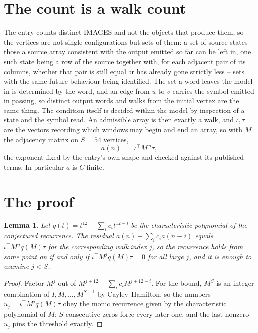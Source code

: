 \documentclass[11pt,a4paper]{article}
\theoremstyle{plain}
\newtheorem{lemma}[theorem]{Lemma}
\theoremstyle{definition}
\begin{document}
\section{The count is a walk count}

The entry counts distinct IMAGES and not the objects that produce them, so the vertices are not single configurations but sets of them: a set of source states -- those a source array consistent with the output emitted so far can be left in, one such state being a row of the source together with, for each adjacent pair of its columns, whether that pair is still equal or has already gone strictly less -- sets with the same future behaviour being identified. The set a word leaves the model in is determined by the word, and an edge from $u$ to $v$ carries the symbol emitted in passing, so distinct output words and walks from the initial vertex are the same thing. The condition itself is decided within the model by inspection of a state and the symbol read.
An admissible array is then exactly a walk, and $\iota,\tau$ are the vectors recording which windows may begin and end an array, so with $M$ the adjacency matrix on $S=54$ vertices,
\[
a(n)\;=\;\iota^{\!\top}M^{\,n}\tau ,
\]
the exponent fixed by the entry's own shape and checked against its published terms. In
particular $a$ is $C$-finite.

\section{The proof}

\begin{lemma}\label{lem:crit}
Let $q(t)=t^{12}-\sum_i c_it^{12-i}$ be the characteristic polynomial of the
conjectured recurrence. The residual $a(n)-\sum_ic_ia(n-i)$ equals
$\iota^{\!\top}M^{\,j}q(M)\tau$ for the corresponding walk index $j$, so the recurrence
holds from some point on if and only if $\iota^{\!\top}M^{j}q(M)\tau=0$ for all large $j$,
and it is enough to examine $j<S$.
\end{lemma}

\begin{proof}
Factor $M^{j}$ out of $M^{j+12}-\sum_ic_iM^{j+12-i}$. For the bound, $M^{S}$
is an integer combination of $I,M,\dots,M^{S-1}$ by Cayley--Hamilton, so the numbers
$u_j=\iota^{\!\top}M^{j}q(M)\tau$ obey the monic recurrence given by the characteristic
polynomial of $M$; $S$ consecutive zeros force every later one, and the last nonzero $u_j$
pins the threshold exactly.
\end{proof}
\end{document}

